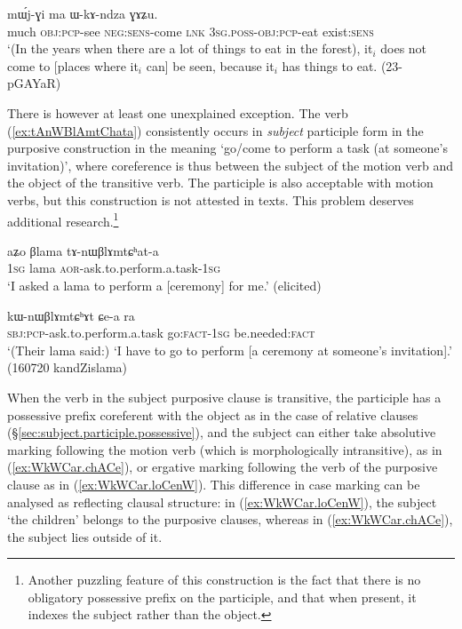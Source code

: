\begin{exe}
	\ex \label{ex:kAmto.mWjGi}
	 mɯ́j-ɣi ma ɯ-kɤ-ndza ɣɤʑu. \\
	much \textsc{obj}:\textsc{pcp}-see \textsc{neg}:\textsc{sens}-come \textsc{lnk} \textsc{3sg}.\textsc{poss}-\textsc{obj}:\textsc{pcp}-eat exist:\textsc{sens} \\
	\glt `(In the years when there are a lot of things to eat in the forest), it$_i$ does not come to [places where it$_i$ can] be seen, because it$_i$ has things to eat. (23-pGAYaR)
\end{exe}

There is however at least one unexplained exception. The verb  (\ref{ex:tAnWBlAmtChata}) consistently occurs in \textit{subject} participle form in the purposive construction in the meaning `go/come to perform a task (at someone's invitation)', where coreference is thus between the subject of the motion verb and the object of the transitive verb. The  participle is also acceptable with motion verbs, but this construction is not attested in texts. This problem deserves additional research.\footnote{Another puzzling feature of this construction is the fact that there is no obligatory possessive prefix on the participle, and that when present, it indexes the subject rather than the object. }

\begin{exe}
	\ex \label{ex:tAnWBlAmtChata}
	\gll aʑo βlama  tɤ-nɯβlɤmtɕʰat-a \\
	\textsc{1sg} lama \textsc{aor}-ask.to.perform.a.task-\textsc{1sg} \\
	\glt `I asked a lama to perform a [ceremony] for me.' (elicited)
\end{exe}

\begin{exe}
	\ex \label{ex:kWnWBlAmtChAt.Cea}
	\gll kɯ-nɯβlɤmtɕʰɤt ɕe-a ra \\
	\textsc{sbj}:\textsc{pcp}-ask.to.perform.a.task go:\textsc{fact}-\textsc{1sg} be.needed:\textsc{fact} \\
	\glt `(Their lama said:) `I have to go to perform [a ceremony at someone's invitation].' (160720 kandZislama)
\end{exe}

When the verb in the subject purposive clause is transitive, the participle has a possessive prefix coreferent with the object as in the case of relative clauses (§\ref{sec:subject.participle.possessive}), and the subject can either take absolutive marking following the motion verb (which is morphologically intransitive), as in (\ref{ex:WkWCar.chACe}), or ergative marking following the verb of the purposive clause as in (\ref{ex:WkWCar.loCenW}). This difference in case marking can be analysed as reflecting clausal structure: in (\ref{ex:WkWCar.loCenW}), the subject  `the children' belongs to the purposive clauses, whereas in (\ref{ex:WkWCar.chACe}), the subject  lies outside of it.


